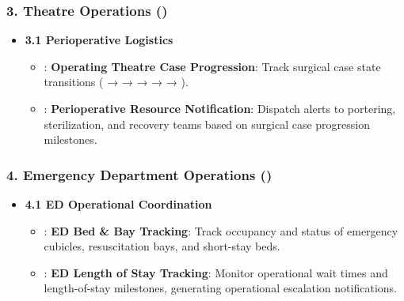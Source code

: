 \subsubsection*{3. Theatre Operations (\texttt{})}
\label{rad:enabling:492}

\begin{itemize}

\item 
\textbf{3.1 Perioperative Logistics}


\begin{itemize}

\item 
\texttt{}: \textbf{Operating Theatre Case Progression}: Track surgical case state transitions (\texttt{} → \texttt{} → \texttt{} → \texttt{} → \texttt{} → \texttt{}).



\item 
\texttt{}: \textbf{Perioperative Resource Notification}: Dispatch alerts to portering, sterilization, and recovery teams based on surgical case progression milestones.



\end{itemize}


\end{itemize}
\label{rad:enabling:496}
\subsubsection*{4. Emergency Department Operations (\texttt{})}
\label{rad:enabling:497}

\begin{itemize}

\item 
\textbf{4.1 ED Operational Coordination}


\begin{itemize}

\item 
\texttt{}: \textbf{ED Bed \& Bay Tracking}: Track occupancy and status of emergency cubicles, resuscitation bays, and short-stay beds.



\item 
\texttt{}: \textbf{ED Length of Stay Tracking}: Monitor operational wait times and length-of-stay milestones, generating operational escalation notifications.



\end{itemize}


\end{itemize}
\label{rad:enabling:501}

